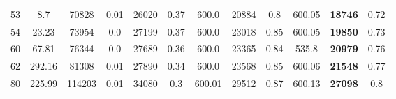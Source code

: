 \begin{table*}[]
\begin{tabular}{|c|cc|ccc|ccc|ccc|}
    53                   & 8.7                                      & 70828                                     & 0.01                                   & 26020                                     & 0.37                                       & 600.0                                  & 20884                                     & 0.8                                        & 600.05                                 & \textbf{18746}                            & 0.72                  \\
    54                   & 23.23                                    & 73954                                     & 0.0                                    & 27199                                     & 0.37                                       & 600.0                                  & 23018                                     & 0.85                                       & 600.05                                 & \textbf{19850}                            & 0.73                  \\
    60                   & 67.81                                    & 76344                                     & 0.0                                    & 27689                                     & 0.36                                       & 600.0                                  & 23365                                     & 0.84                                       & 535.8                                  & \textbf{20979}                            & 0.76                  \\
    62                   & 292.16                                   & 81308                                     & 0.01                                   & 27890                                     & 0.34                                       & 600.0                                  & 23568                                     & 0.85                                       & 600.06                                 & \textbf{21548}                            & 0.77                  \\
    80                   & 225.99                                   & 114203                                    & 0.01                                   & 34080                                     & 0.3                                        & 600.01                                 & 29512                                     & 0.87                                       & 600.13                                 & \textbf{27098}                            & 0.8                   \\

\end{tabular}
\end{table*}
